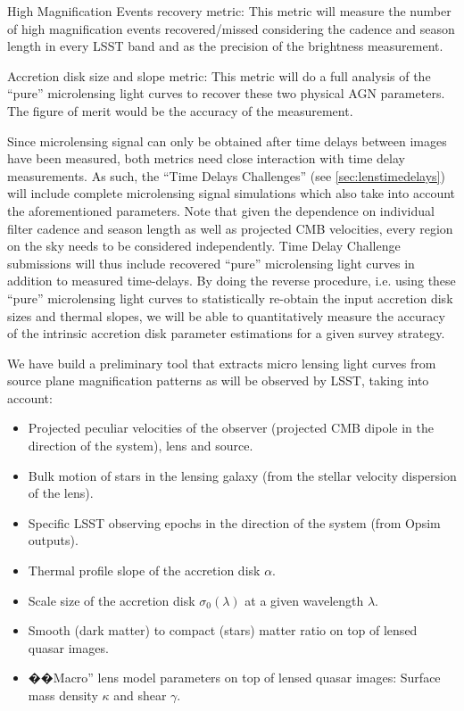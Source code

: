High Magnification Events recovery metric: This metric will measure the
number of high magnification events recovered/missed considering the
cadence and season length in every LSST band and as the precision of the
brightness measurement.



Accretion disk size and slope metric: This metric will do a full
analysis of the ``pure'' microlensing light curves to recover these two
physical AGN parameters. The figure of merit would be the accuracy of
the measurement.

Since microlensing signal can only be obtained after time delays between images
have been measured, both metrics need close interaction with time delay
measurements. As such, the ``Time Delays Challenges'' (see
\autoref{sec:lenstimedelays}) will include complete microlensing signal
simulations which also take into account the aforementioned parameters. Note
that given
the dependence on individual filter cadence and season length as well as
projected CMB velocities, every region on the sky needs to be considered
independently. Time Delay Challenge submissions will thus include recovered
``pure'' microlensing
light curves in addition to measured time-delays. By doing the reverse
procedure, i.e. using these ``pure'' microlensing light curves to statistically
re-obtain the input accretion disk sizes and thermal slopes, we will be able to
quantitatively measure the accuracy of the intrinsic accretion disk parameter
estimations for a given survey strategy.



We have build a preliminary tool that extracts micro lensing light curves from source plane magnification patterns as will be observed by LSST, taking into account:
\begin{itemize}
\item Projected peculiar velocities of the observer (projected CMB dipole in the direction of the system), lens and source.
\item Bulk motion of stars in the lensing galaxy (from the stellar velocity dispersion of the lens).
\item Specific LSST observing epochs in the direction of the system (from Opsim outputs).
\item Thermal profile slope of the accretion disk $\alpha$.
\item Scale size of the accretion disk $\sigma_{0}(\lambda)$ at a given wavelength $\lambda$.
\item Smooth (dark matter) to compact (stars) matter ratio on top of lensed quasar images.
\item ��Macro'' lens model parameters on top of lensed quasar images: Surface mass density $\kappa$ and shear $\gamma$.
\end{itemize}

